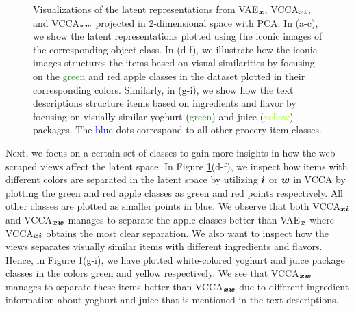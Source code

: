 \begin{figure}[t]
	\centering
	
	\vspace{-1mm}
	\caption{ Visualizations of the latent representations from VAE$_{\bm{x}}$, VCCA$_{{\bm{x}}{\bm{i}}}$, and VCCA$_{{\bm{x}}{\bm{w}}}$ projected in 2-dimensional space with PCA. In (a-c), we show the latent representations plotted using the iconic images of the corresponding object class. In (d-f), we illustrate how the iconic images structures the items based on visual similarities by focusing on the \textcolor{ForestGreen}{green} and \textcolor{RedOrange}{red} apple classes in the dataset plotted in their corresponding colors. Similarly, in (g-i), we show how the text descriptions structure items based on ingredients and flavor by focusing on visually similar yoghurt (\textcolor{ForestGreen}{green}) and juice (\textcolor{GreenYellow}{yellow}) packages. The \textcolor{blue}{blue} dots correspond to all other grocery item classes. } 
	\label{fig:latent_space_visualizations}
	\vspace{-2mm}
\end{figure}

Next, we focus on a certain set of classes to gain more insights in how the web-scraped views affect the latent space. 
In Figure \ref{fig:latent_space_visualizations}(d-f), we inspect how items with different colors are separated in the latent space by utilizing ${\bm{i}}$ or ${\bm{w}}$ in VCCA by plotting the green and red apple classes as green and red points respectively. All other classes are plotted as smaller points in blue. We observe that both VCCA$_{{\bm{x}} {\bm{i}}}$ and VCCA$_{{\bm{x}} {\bm{w}}}$ manages to separate the apple classes better than VAE$_{{\bm{x}}}$ where VCCA$_{{\bm{x}} {\bm{i}}}$ obtains the most clear separation.
We also want to inspect how the views separates visually similar items with different ingredients and flavors. Hence, in Figure \ref{fig:latent_space_visualizations}(g-i), we have plotted  white-colored yoghurt and juice package classes in the colors green and yellow respectively. 
We see that VCCA$_{{\bm{x}} {\bm{w}}}$ manages to separate these items better than VCCA$_{{\bm{x}} {\bm{w}}}$ due to different ingredient information about yoghurt and juice that is mentioned in the text descriptions. 


